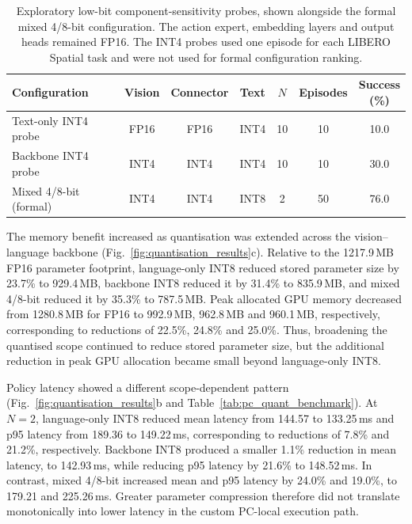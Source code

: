 \begin{table}
  \centering
  \caption{Exploratory low-bit component-sensitivity probes, shown alongside
  the formal mixed 4/8-bit configuration. The action expert, embedding layers
  and output heads remained FP16. The INT4 probes used one episode for each
  LIBERO Spatial task and were not used for formal configuration ranking.}
  \label{tab:pc_int4_probes}
  \small
  \setlength{\tabcolsep}{3.5pt}
  \begin{tabular}{@{}lcccccc@{}}
    \toprule
    Configuration & Vision & Connector & Text & \(N\) & Episodes &
    \shortstack{Success\\(\%)} \\
    \midrule
    Text-only INT4 probe & FP16 & FP16 & INT4 & 10 & 10 & 10.0 \\
    Backbone INT4 probe & INT4 & INT4 & INT4 & 10 & 10 & 30.0 \\
    Mixed 4/8-bit (formal) & INT4 & INT4 & INT8 & 2 & 50 & 76.0 \\
    \bottomrule
  \end{tabular}
\end{table}

The memory benefit increased as quantisation was extended across the
vision--language backbone (Fig.~\ref{fig:quantisation_results}c). Relative to
the 1217.9\,MB FP16 parameter footprint,
language-only INT8 reduced stored parameter size by 23.7\% to 929.4\,MB,
backbone INT8 reduced it by 31.4\% to 835.9\,MB, and mixed 4/8-bit reduced it by
35.3\% to 787.5\,MB. Peak allocated GPU memory decreased from 1280.8\,MB for
FP16 to 992.9\,MB, 962.8\,MB and 960.1\,MB, respectively, corresponding to
reductions of 22.5\%, 24.8\% and 25.0\%. Thus, broadening the quantised scope
continued to reduce stored parameter size, but the additional reduction in peak
GPU allocation became small beyond language-only INT8.

Policy latency showed a different scope-dependent pattern
(Fig.~\ref{fig:quantisation_results}b and
Table~\ref{tab:pc_quant_benchmark}). At \(N=2\), language-only INT8 reduced
mean latency from 144.57 to 133.25\,ms and p95 latency from 189.36 to
149.22\,ms, corresponding to reductions of 7.8\% and 21.2\%, respectively.
Backbone INT8 produced a smaller 1.1\% reduction in mean latency, to
142.93\,ms, while reducing p95 latency by 21.6\% to 148.52\,ms. In contrast,
mixed 4/8-bit increased mean and p95 latency by 24.0\% and 19.0\%, to 179.21
and 225.26\,ms. Greater parameter compression therefore did not translate
monotonically into lower latency in the custom PC-local execution path.

